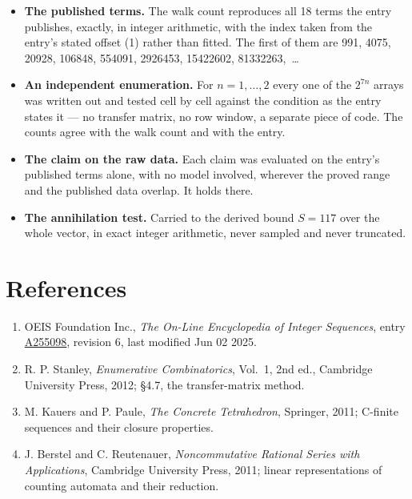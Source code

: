 \documentclass[11pt]{article}
\theoremstyle{definition}
\begin{document}
\begin{itemize}

\item {\bfseries The published terms.} The walk count reproduces all 18 terms the entry publishes, exactly, in integer arithmetic, with the index taken from the entry's stated offset (1) rather than fitted. The first of them are 991, 4075, 20928, 106848, 554091, 2926453, 15422602, 81332263,~\dots

\item {\bfseries An independent enumeration.} For $n = 1,\dots,2$ every one of the $2^{7n}$ arrays was written out and tested cell by cell against the condition as the entry states it --- no transfer matrix, no row window, a separate piece of code. The counts agree with the walk count and with the entry.

\item {\bfseries The claim on the raw data.} Each claim was evaluated on the entry's published terms alone, with no model involved, wherever the proved range and the published data overlap. It holds there.

\item {\bfseries The annihilation test.} Carried to the derived bound $S = 117$ over the whole vector, in exact integer arithmetic, never sampled and never truncated.

\end{itemize}

\section{References}

\begin{enumerate}

\item OEIS Foundation Inc., \emph{The On-Line Encyclopedia of Integer Sequences}, entry \href{https://oeis.org/A255098}{A255098}, revision 6, last modified Jun 02 2025.

\item R. P. Stanley, \emph{Enumerative Combinatorics}, Vol.~1, 2nd ed., Cambridge University Press, 2012; \S4.7, the transfer-matrix method.

\item M. Kauers and P. Paule, \emph{The Concrete Tetrahedron}, Springer, 2011; C-finite sequences and their closure properties.

\item J. Berstel and C. Reutenauer, \emph{Noncommutative Rational Series with Applications}, Cambridge University Press, 2011; linear representations of counting automata and their reduction.

\end{enumerate}
\end{document}
